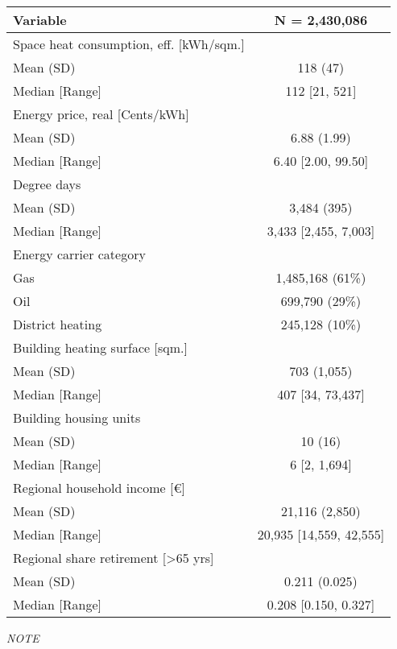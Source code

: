\captionsetup[table]{labelformat=empty,skip=1pt}
\begin{longtable}{lc}
\toprule
\textbf{Variable} & \textbf{N = 2,430,086} \\ 
\midrule
Space heat consumption, eff. [kWh/sqm.] &  \\ 
Mean (SD) & 118 (47) \\ 
Median [Range] & 112 [21, 521] \\ 
Energy price, real [Cents/kWh] &  \\ 
Mean (SD) & 6.88 (1.99) \\ 
Median [Range] & 6.40 [2.00, 99.50] \\ 
Degree days &  \\ 
Mean (SD) & 3,484 (395) \\ 
Median [Range] & 3,433 [2,455, 7,003] \\ 
Energy carrier category &  \\ 
Gas & 1,485,168 (61\%) \\ 
Oil & 699,790 (29\%) \\ 
District heating & 245,128 (10\%) \\ 
Building heating surface [sqm.] &  \\ 
Mean (SD) & 703 (1,055) \\ 
Median [Range] & 407 [34, 73,437] \\ 
Building housing units &  \\ 
Mean (SD) & 10 (16) \\ 
Median [Range] & 6 [2, 1,694] \\ 
Regional household income [€] &  \\ 
Mean (SD) & 21,116 (2,850) \\ 
Median [Range] & 20,935 [14,559, 42,555] \\ 
Regional share retirement [>65 yrs] &  \\ 
Mean (SD) & 0.211 (0.025) \\ 
Median [Range] & 0.208 [0.150, 0.327] \\ 
 \bottomrule
\end{longtable}
\begin{minipage}{\linewidth}
\emph{NOTE}\\ 
\end{minipage}

